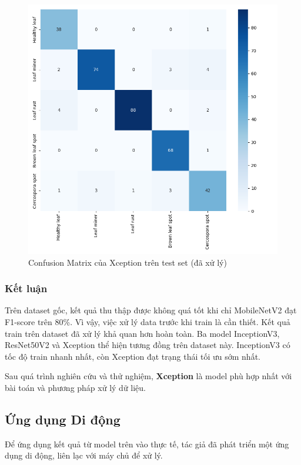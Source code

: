 \documentclass[a4paper,14pt]{extarticle}
\begin{document}
		\begin{figure}[H]
			\centering
			\includegraphics[scale=0.5]{images/xception_matrix.png}
			\caption{Confusion Matrix của Xception trên test set (đã xử lý)}
		\end{figure}

		\subsubsection{Kết luận}

		Trên dataset gốc, kết quả thu thập được không quá tốt khi chỉ MobileNetV2 đạt F1-score trên 80\%. Vì vậy, việc xử lý data trước khi train là cần thiết. Kết quả train trên dataset đã xử lý khả quan hơn hoàn toàn. Ba model InceptionV3, ResNet50V2 và Xception thể hiện tương đồng trên dataset này. InceptionV3 có tốc độ train nhanh nhất, còn Xception đạt trạng thái tối ưu sớm nhất.

		Sau quá trình nghiên cứu và thử nghiệm, \textbf{Xception} là model phù hợp nhất với bài toán và phương pháp xử lý dữ liệu.

	\subsection{Ứng dụng Di động}
	Để ứng dụng kết quả từ model trên vào thực tế, tác giả đã phát triển một ứng dụng di động, liên lạc với máy chủ để xử lý.
\end{document}
